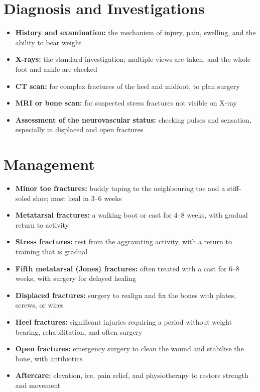 \section*{Diagnosis and Investigations}
\begin{itemize}
    \item \textbf{History and examination:} the mechanism of injury, pain, swelling, and the ability to bear weight
    \item \textbf{X-rays:} the standard investigation; multiple views are taken, and the whole foot and ankle are checked
    \item \textbf{CT scan:} for complex fractures of the heel and midfoot, to plan surgery
    \item \textbf{MRI or bone scan:} for suspected stress fractures not visible on X-ray
    \item \textbf{Assessment of the neurovascular status:} checking pulses and sensation, especially in displaced and open fractures
\end{itemize}

\section*{Management}
\begin{itemize}
    \item \textbf{Minor toe fractures:} buddy taping to the neighbouring toe and a stiff-soled shoe; most heal in 3--6 weeks
    \item \textbf{Metatarsal fractures:} a walking boot or cast for 4--8 weeks, with gradual return to activity
    \item \textbf{Stress fractures:} rest from the aggravating activity, with a return to training that is gradual
    \item \textbf{Fifth metatarsal (Jones) fractures:} often treated with a cast for 6--8 weeks, with surgery for delayed healing
    \item \textbf{Displaced fractures:} surgery to realign and fix the bones with plates, screws, or wires
    \item \textbf{Heel fractures:} significant injuries requiring a period without weight bearing, rehabilitation, and often surgery
    \item \textbf{Open fractures:} emergency surgery to clean the wound and stabilise the bone, with antibiotics
    \item \textbf{Aftercare:} elevation, ice, pain relief, and physiotherapy to restore strength and movement
\end{itemize}

